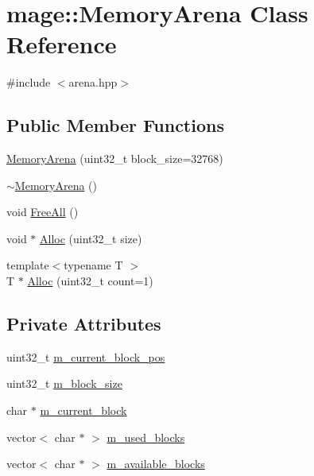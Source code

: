 \hypertarget{classmage_1_1_memory_arena}{}\section{mage\+:\+:Memory\+Arena Class Reference}
\label{classmage_1_1_memory_arena}


{\ttfamily \#include $<$arena.\+hpp$>$}

\subsection*{Public Member Functions}
\begin{DoxyCompactItemize}
\item 
\hyperlink{classmage_1_1_memory_arena_aa243c458adb14e211f4dd944c4c82148}{Memory\+Arena} (uint32\+\_\+t block\+\_\+size=32768)
\item 
\hyperlink{classmage_1_1_memory_arena_acfee6fc205e2eaf6aeef4acf19948e6e}{$\sim$\+Memory\+Arena} ()
\item 
void \hyperlink{classmage_1_1_memory_arena_a30452ffc5813f5c62232713020fbe405}{Free\+All} ()
\item 
void $\ast$ \hyperlink{classmage_1_1_memory_arena_a01e00ac6e109249bd80a1e9e79eb0b28}{Alloc} (uint32\+\_\+t size)
\item 
{\footnotesize template$<$typename T $>$ }\\T $\ast$ \hyperlink{classmage_1_1_memory_arena_a16431dbfc49ddaee803fb0ab52303302}{Alloc} (uint32\+\_\+t count=1)
\end{DoxyCompactItemize}
\subsection*{Private Attributes}
\begin{DoxyCompactItemize}
\item 
uint32\+\_\+t \hyperlink{classmage_1_1_memory_arena_a3874097398455749a85fe50a9e4984c0}{m\+\_\+current\+\_\+block\+\_\+pos}
\item 
uint32\+\_\+t \hyperlink{classmage_1_1_memory_arena_a82b0c7432237699b85a92e8a8f0c96fe}{m\+\_\+block\+\_\+size}
\item 
char $\ast$ \hyperlink{classmage_1_1_memory_arena_a13eba6e2a9f8d9db2df5674aa7ce0428}{m\+\_\+current\+\_\+block}
\item 
vector$<$ char $\ast$ $>$ \hyperlink{classmage_1_1_memory_arena_affb37aae6087014287b43d50521dd0fb}{m\+\_\+used\+\_\+blocks}
\item 
vector$<$ char $\ast$ $>$ \hyperlink{classmage_1_1_memory_arena_a2295aae794acabd26ef9c1ff4908b029}{m\+\_\+available\+\_\+blocks}
\end{DoxyCompactItemize}


